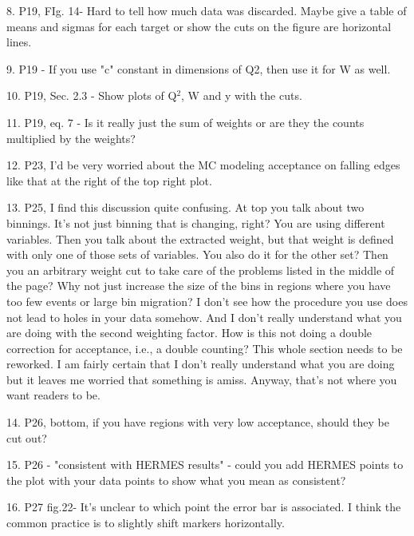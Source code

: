 \documentclass[12pt]{article}
\begin{document}
8.
P19, FIg. 14- Hard to tell how much data was discarded.  Maybe give a table of means and 
sigmas for each target or show the cuts on the figure are horizontal lines.



9.
P19 - If you use "c" constant in dimensions of Q2, then use it for W as well.



10.
P19, Sec. 2.3 - Show plots of Q$^2$, W and y with the cuts.



11.
P19, eq. 7 - Is it really just the sum of weights or are they the counts multiplied by the 
weights?



12.
P23, I’d be very worried about the MC modeling acceptance on falling edges like that at the 
right of the top right plot.



13.
P25, I find this discussion quite confusing.   At top you talk about two binnings.  It’s not just 
binning that is changing, right?  You are using different variables.  Then you talk about the 
extracted weight, but that weight is defined with only one of those sets of variables.  You 
also do it for the other set?  Then you an arbitrary weight cut to take care of the problems 
listed in the middle of the page?  Why not just increase the size of the bins in regions where 
you have too few events or large bin migration?  I don’t see how the procedure you use 
does not lead to holes in your data somehow.  And I don’t really understand what you are 
doing with the second weighting factor.  How is this not doing a double correction for 
acceptance, i.e., a double counting?  This whole section needs to be reworked.  I am fairly 
certain that I don’t really understand what you are doing but it leaves me worried that 
something is amiss.  Anyway, that’s not where you want readers to be.  



14.
P26, bottom, if you have regions with very low acceptance, should they be cut out?



15.
P26 - "consistent with HERMES results" - could you add HERMES points to the plot with 
your data points to show what you mean as consistent?



16.
P27 fig.22-
 It's unclear to which point the error bar is associated. I think the common 
practice is to slightly shift markers horizontally.
\end{document}
